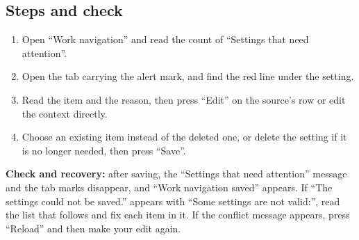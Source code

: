 \subsection{Steps and check}
\begin{enumerate}
\item Open “Work navigation” and read the count of “Settings that need attention”.
\item Open the tab carrying the alert mark, and find the red line under the setting.
\item Read the item and the reason, then press “Edit” on the source's row or edit the context directly.
\item Choose an existing item instead of the deleted one, or delete the setting if it is no longer needed, then press “Save”.
\end{enumerate}

\textbf{Check and recovery:} after saving, the “Settings that need attention” message and the tab marks disappear, and “Work navigation saved” appears. If “The settings could not be saved.” appears with “Some settings are not valid:”, read the list that follows and fix each item in it. If the conflict message appears, press “Reload” and then make your edit again.
